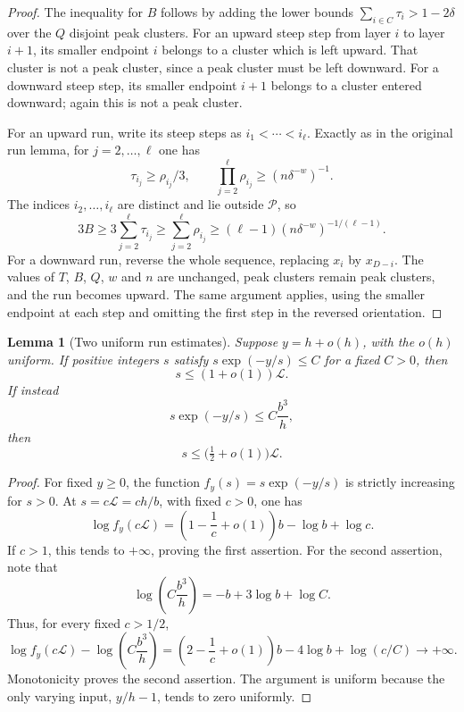 \documentclass[11pt]{amsart}
\newtheorem{lemma}[theorem]{Lemma}
\theoremstyle{definition}
\theoremstyle{remark}
\begin{document}
\begin{proof}
The inequality for $B$ follows by adding the lower bounds
$\sum_{i\in C}\tau_i>1-2\delta$ over the $Q$ disjoint peak clusters.
For an upward steep step from layer $i$ to layer $i+1$, its smaller endpoint
$i$ belongs to a cluster which is left upward.  That cluster is not a peak
cluster, since a peak cluster must be left downward.  For a downward steep
step, its smaller endpoint $i+1$ belongs to a cluster entered downward;
again this is not a peak cluster.

For an upward run, write its steep steps as
$i_1<\cdots<i_\ell$.  Exactly as in the original run lemma, for
$j=2,\ldots,\ell$ one has
\[
 \tau_{i_j}\ge\rho_{i_j}/3,
 \qquad
 \prod_{j=2}^{\ell}\rho_{i_j}\ge(n\delta^{-w})^{-1}.
\]
The indices $i_2,\ldots,i_\ell$ are distinct and lie outside
$\mathcal P$, so
\[
 3B\ge3\sum_{j=2}^{\ell}\tau_{i_j}
 \ge\sum_{j=2}^{\ell}\rho_{i_j}
 \ge(\ell-1)(n\delta^{-w})^{-1/(\ell-1)}.
\]
For a downward run, reverse the whole sequence, replacing $x_i$ by
$x_{D-i}$.  The values of $T$, $B$, $Q$, $w$ and $n$ are unchanged,
peak clusters remain peak clusters, and the run becomes upward.  The same
argument applies, using the smaller endpoint at each step and omitting the
first step in the reversed orientation.
\end{proof}

\begin{lemma}[Two uniform run estimates]\label{lem:uniform}
Suppose $y=h+o(h)$, with the $o(h)$ uniform.  If positive integers $s$
satisfy $s\exp(-y/s)\le C$ for a fixed $C>0$, then
\[
 s\le(1+o(1))\mathcal L.
\]
If instead
\[
 s\exp(-y/s)\le C\frac{b^3}{h},
\]
then
\[
 s\le\bigl(\tfrac12+o(1)\bigr)\mathcal L.
\]
\end{lemma}

\begin{proof}
For fixed $y\ge0$, the function $f_y(s)=s\exp(-y/s)$ is strictly
increasing for $s>0$.
At $s=c\mathcal L=ch/b$, with fixed $c>0$, one has
\[
 \log f_y(c\mathcal L)
 =\left(1-\frac1c+o(1)\right)b-\log b+\log c.
\]
If $c>1$, this tends to $+\infty$, proving the first assertion.
For the second assertion, note that
\[
 \log\left(C\frac{b^3}{h}\right)
 =-b+3\log b+\log C.
\]
Thus, for every fixed $c>1/2$,
\[
 \log f_y(c\mathcal L)
 -\log\left(C\frac{b^3}{h}\right)
 =\left(2-\frac1c+o(1)\right)b-4\log b+\log(c/C)
 \longrightarrow+\infty.
\]
Monotonicity proves the second assertion.  The argument is uniform because
the only varying input, $y/h-1$, tends to zero uniformly.
\end{proof}
\end{document}

